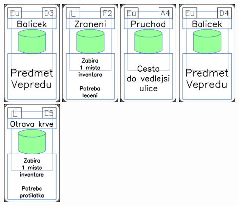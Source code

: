\documentclass[a4paper]{article}
\begin{document}
	\includegraphics[width=3.0cm]{img-4_17}
	\includegraphics[width=3.0cm]{img-4_56}
	\includegraphics[width=3.0cm]{img-4_33}
	\includegraphics[width=3.0cm]{img-4_18}
	\includegraphics[width=3.0cm]{img-4_54}
\end{document}
